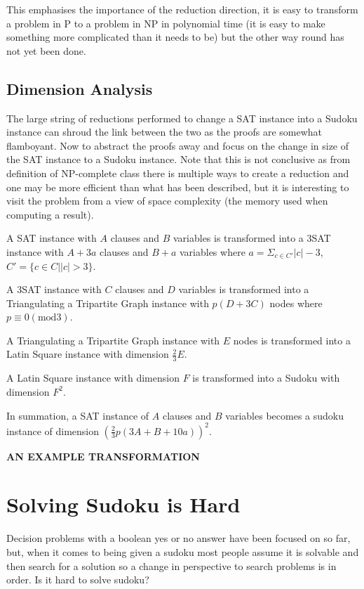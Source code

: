 \documentclass[a4paper,11pt]{report}
\begin{document}
This emphasises the importance of the reduction direction, it is easy to transform a problem in P to a problem in NP in polynomial time (it is easy to make something more complicated than it needs to be) but the other way round has not yet been done. 

\subsection{Dimension Analysis}

The large string of reductions performed to change a SAT instance into a Sudoku instance can shroud the link between the two as the proofs are somewhat flamboyant. Now to abstract the proofs away and focus on the change in size of the SAT instance to a Sudoku instance. Note that this is not conclusive as from definition of NP-complete class there is multiple ways to create a reduction and one may be more efficient than what has been described, but it is interesting to visit the problem from a view of space complexity (the memory used when computing a result).

A SAT instance with $A$ clauses and $B$ variables is transformed into a 3SAT instance with $A + 3a$ clauses and $B+a$ variables where $a=\Sigma_{c\in C'}|c|-3$, $C'=\{c\in C | |c|>3\}$. 

A 3SAT instance with $C$ clauses and $D$ variables is transformed into a Triangulating a Tripartite Graph instance with $p(D+3C)$ nodes where $p\equiv 0 (\text{mod}3)$.

A Triangulating a Tripartite Graph instance with $E$ nodes is transformed into a Latin Square instance with dimension $\frac{2}{3}E$.

A Latin Square instance with dimension $F$ is transformed into a Sudoku with dimension $F^2$.

In summation, a SAT instance of $A$ clauses and $B$ variables becomes a sudoku instance of dimension $(\frac{2}{3}p(3A+B+10a))^2 $.

\textbf{AN EXAMPLE TRANSFORMATION}

\section{Solving Sudoku is Hard}

Decision problems with a boolean yes or no answer have been focused on so far, but, when it comes to being given a sudoku most people assume it is solvable and then search for a solution so a change in perspective to search problems is in order. Is it hard to solve sudoku? 
\end{document}
